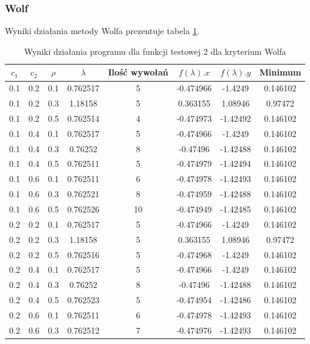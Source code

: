 \documentclass{classrep}
\begin{document}
\subsubsection{Wolf}

Wyniki działania metody Wolfa prezentuje tabela \ref{wolf2}.

\begin{table}
  \centering
  \caption{Wyniki działania programu dla funkcji testowej 2 dla kryterium Wolfa}
  \label{wolf2}
  \begin{tabular}{|c|c|c|c|c|c|c|c|}
    \hline
    $c_1$ & $c_2$ & $\rho$ & $\lambda$ & Ilość wywołań & $f(\lambda).x$ & $f(\lambda).y$ & Minimum \\
    \hline
    0.1 & 0.2 & 0.1 & 0.762517 & 5 & -0.474966 & -1.4249 & 0.146102 \\
    0.1 & 0.2 & 0.3 & 1.18158 & 5 & 0.363155 & 1.08946 & 0.97472 \\
    0.1 & 0.2 & 0.5 & 0.762514 & 4 & -0.474973 & -1.42492 & 0.146102 \\
    0.1 & 0.4 & 0.1 & 0.762517 & 5 & -0.474966 & -1.4249 & 0.146102 \\
    0.1 & 0.4 & 0.3 & 0.76252 & 8 & -0.47496 & -1.42488 & 0.146102 \\
    0.1 & 0.4 & 0.5 & 0.762511 & 5 & -0.474979 & -1.42494 & 0.146102 \\
    0.1 & 0.6 & 0.1 & 0.762511 & 6 & -0.474978 & -1.42493 & 0.146102 \\
    0.1 & 0.6 & 0.3 & 0.762521 & 8 & -0.474959 & -1.42488 & 0.146102 \\
    0.1 & 0.6 & 0.5 & 0.762526 & 10 & -0.474949 & -1.42485 & 0.146102 \\
    0.2 & 0.2 & 0.1 & 0.762517 & 5 & -0.474966 & -1.4249 & 0.146102 \\
    0.2 & 0.2 & 0.3 & 1.18158 & 5 & 0.363155 & 1.08946 & 0.97472 \\
    0.2 & 0.2 & 0.5 & 0.762516 & 5 & -0.474968 & -1.4249 & 0.146102 \\
    0.2 & 0.4 & 0.1 & 0.762517 & 5 & -0.474966 & -1.4249 & 0.146102 \\
    0.2 & 0.4 & 0.3 & 0.76252 & 8 & -0.47496 & -1.42488 & 0.146102 \\
    0.2 & 0.4 & 0.5 & 0.762523 & 5 & -0.474954 & -1.42486 & 0.146102 \\
    0.2 & 0.6 & 0.1 & 0.762511 & 6 & -0.474978 & -1.42493 & 0.146102 \\
    0.2 & 0.6 & 0.3 & 0.762512 & 7 & -0.474976 & -1.42493 & 0.146102 \\

\end{tabular}
\end{table}
\end{document}
